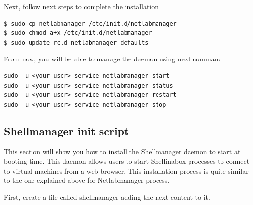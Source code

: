 \documentclass{article}
\begin{document}
Next, follow next steps to complete the installation

\begin{verbatim}
$ sudo cp netlabmanager /etc/init.d/netlabmanager
$ sudo chmod a+x /etc/init.d/netlabmanager
$ sudo update-rc.d netlabmanager defaults
\end{verbatim}

From now, you will be able to manage the daemon using next command

\begin{verbatim}
sudo -u <your-user> service netlabmanager start
sudo -u <your-user> service netlabmanager status
sudo -u <your-user> service netlabmanager restart
sudo -u <your-user> service netlabmanager stop
\end{verbatim}

\subsection{Shellmanager init script}
\label{sub:ShellManagerBoot}
This section will show you how to install the Shellmanager daemon to start at booting time. This daemon allows users to start Shellinabox processes to connect to virtual machines from a web browser. This installation process is quite similar to the one explained above for Netlabmanager process.

First, create a file called shellmanager adding the next content to it.
\end{document}
